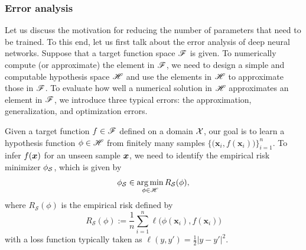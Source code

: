 \documentclass[nohyperref]{article}
\theoremstyle{plain}
\theoremstyle{definition}
\theoremstyle{remark}
\begin{document}
\subsubsection{Error analysis}
Let us discuss the motivation for reducing the number of parameters that need to be trained. To this end, let us first talk about the error analysis of deep neural networks.
Suppose that a target function space ${\mathscr{F}}$ is given. To numerically compute (or approximate) the element in ${\mathscr{F}}$, we need to design a simple and computable hypothesis space ${\mathscr{H}}$ and use the elements in ${\mathscr{H}}$ to approximate those in ${\mathscr{F}}$.
To evaluate how well a numerical solution in ${\mathscr{H}}$ approximates an element in ${\mathscr{F}}$, we introduce three typical errors: the approximation, generalization, and optimization errors.

Given a target function $f\in {\mathscr{F}}$ defined on a domain ${\mathcal{X}}$,  our goal is to learn a hypothesis function $\phi\in{\mathscr{H}}$ from finitely many samples $\{( \bm{x}_i,f(\bm{x}_i){ )}\}_{i=1}^n$. 
To infer $f({\bm{x}})$  for an unseen sample ${\bm{x}}$, we need to identify the empirical risk minimizer $\phi_{\mathcal{S}}$, which is given by
\begin{equation}\label{eqn:emloss}
	\phi_{\mathcal{S}}
	 \in 
	 \operatorname*{arg\,min}_{\phi\in {\mathscr{H}}}R_{\mathcal{S}}(\phi),
\end{equation}
where $R_{\mathcal{S}}(\phi)$ is the empirical risk defined by 
\begin{equation*}
 R_{\mathcal{S}}(\phi):=
	\frac{1}{n}\sum_{i=1}^n \ell\big( \phi(\bm{x}_i),f(\bm{x}_i)\big) 
\end{equation*}
with a loss function typically taken as $\ell(y,y')=\frac{1}{2}|y-y'|^2$. 
	
\end{document}
